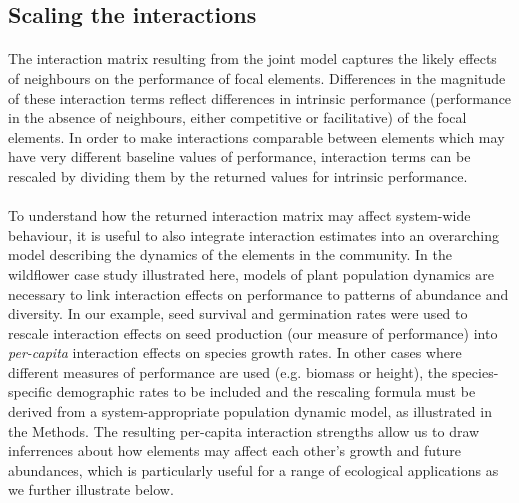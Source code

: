\documentclass[a4,12pt]{article}
\begin{document}
    \subsection{Scaling the interactions}
    
    \paragraph{}
	The interaction matrix resulting from the joint model captures the likely effects of neighbours on the performance of focal elements. Differences in the magnitude of these interaction terms reflect differences in intrinsic performance (performance in the absence of neighbours, either competitive or facilitative) of the focal elements. In order to make interactions comparable between elements which may have very different baseline values of performance, interaction terms can be rescaled by dividing them by the returned values for intrinsic performance. 


    \paragraph{}
    To understand how the returned interaction matrix may affect system-wide behaviour, it is useful to also integrate interaction estimates into an overarching model describing the dynamics of the elements in the community. In the wildflower case study illustrated here, models of plant population dynamics are necessary to link interaction effects on performance to patterns of abundance and diversity. In our example, seed survival and germination rates were used to rescale interaction effects on seed production (our measure of performance) into \textit{per-capita} interaction effects on species growth rates. In other cases where different measures of performance are used (e.g. biomass or height), the species-specific demographic rates to be included and the rescaling formula must be derived from a system-appropriate population dynamic model, as illustrated in the Methods. The resulting per-capita interaction strengths allow us to draw inferrences about how elements may affect each other's growth and future abundances, which is particularly useful for a range of ecological applications as we further illustrate below. \\
\end{document}
